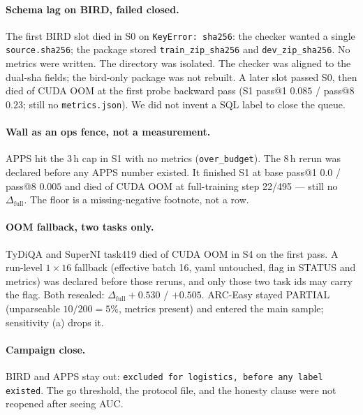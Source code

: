 \paragraph{Schema lag on BIRD, failed closed.}
The first BIRD slot died in S0 on \texttt{KeyError: sha256}: the
checker wanted a single \texttt{source.sha256}; the package stored
\texttt{train\_zip\_sha256} and \texttt{dev\_zip\_sha256}. No
metrics were written. The directory was isolated. The checker was
aligned to the dual-sha fields; the bird-only package was not
rebuilt. A later slot passed S0, then died of CUDA OOM at the
first probe backward pass (S1 pass@1 $0.085$ / pass@8 $0.23$;
still no \texttt{metrics.json}).
We did not invent a SQL label to close the queue.

\paragraph{Wall as an ops fence, not a measurement.}
APPS hit the 3\,h cap in S1 with no metrics
(\texttt{over\_budget}). The 8\,h rerun was declared before any
APPS number existed. It finished S1 at base pass@1 $0.0$ /
pass@8 $0.005$ and died of CUDA OOM at full-training step 22/495
--- still no $\Delta_{\mathrm{full}}$.
The floor is a missing-negative footnote, not a row.

\paragraph{OOM fallback, two tasks only.}
TyDiQA and SuperNI task419 died of CUDA OOM in S4 on the first
pass. A run-level $1{\times}16$ fallback (effective batch 16, yaml
untouched, flag in STATUS and metrics) was declared before those
reruns, and only those two task ids may carry the flag. Both
resealed: $\Delta_{\mathrm{full}}+0.530$ / $+0.505$.
ARC-Easy stayed PARTIAL (unparseable $10/200=5\%$, metrics
present) and entered the main sample; sensitivity (a) drops it.

\paragraph{Campaign close.}
BIRD and APPS stay out:
\texttt{excluded for logistics, before any label existed}.
The go threshold, the protocol file, and the honesty clause were
not reopened after seeing AUC.

